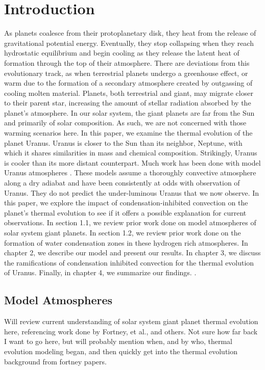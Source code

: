 \documentclass[11pt]{ucscthesisbs}
\begin{document}
\chapter{Introduction}
As planets coalesce from their protoplanetary disk, they heat from the release of gravitational potential energy. Eventually, they stop collapsing when they reach hydrostatic equilibrium and begin cooling as they release the latent heat of formation through the top of their atmosphere. There are deviations from this evolutionary track, as when terrestrial planets undergo a greenhouse effect, or warm due to the formation of a secondary atmosphere created by outgassing of cooling molten material. Planets, both terrestrial and giant, may migrate closer to their parent star, increasing the amount of stellar radiation absorbed by the planet's atmosphere. In our solar system, the giant planets are far from the Sun and primarily of solar composition. As such, we are not concerned with those warming scenarios here. In this paper, we examine the thermal evolution of the planet Uranus. Uranus is closer to the Sun than its neighbor, Neptune, with which it shares similarities in mass and chemical composition. Strikingly, Uranus is cooler than its more distant counterpart. Much work has been done with model Uranus atmospheres \citep{fortney_2011}. These models assume a thoroughly convective atmosphere along a dry adiabat and have been consistently at odds with observation of Uranus. They do not predict the under-luminous Uranus that we now observe. In this paper, we explore the impact of condensation-inhibited convection on the planet's thermal evolution to see if it offers a possible explanation for current observations. In section 1.1, we review prior work done on model atmospheres of solar system giant planets. In section 1.2, we review prior work done on the formation of water condensation zones in these hydrogen rich atmospheres. In chapter 2, we describe our model and present our results. In chapter 3, we discuss the ramifications of condensation inhibited convection for the thermal evolution of Uranus. Finally, in chapter 4, we summarize our findings.\citep{friedson_2017} \citep{leconte_2017}.



\section{Model Atmospheres}

Will review current understanding of solar system giant planet thermal evolution here, referencing work done by Fortney, et al., and others. Not sure how far back I want to go here, but will probably mention when, and by who, thermal evolution modeling began, and then quickly get into the thermal evolution background from fortney papers.
\end{document}

